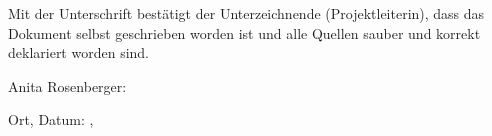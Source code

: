 Mit der  Unterschrift best\"atigt der Unterzeichnende  (Projektleiterin), dass
das Dokument selbst geschrieben worden ist und alle Quellen sauber und korrekt
deklariert worden sind.

\vspace*{3em}

Anita Rosenberger:  \underline{\hspace{8cm}}

\vspace*{3em}

Ort, Datum:  \underline{\hspace{5cm}},  \underline{\hspace{4cm}}
